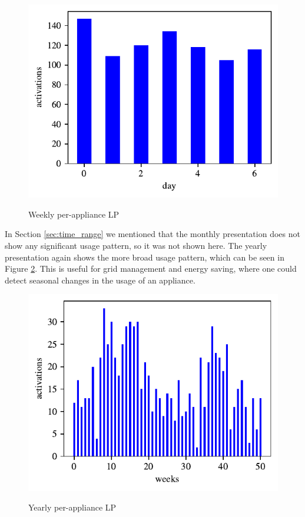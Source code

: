 \begin{figure}[H]
	\centering
	\caption{Weekly per-appliance LP}
	\includegraphics[]{../Figures/LPS/WM_weekly.pdf}
	\label{fig:WM_weekly}
\end{figure}

In Section \ref{sec:time_range} we mentioned that the monthly presentation does not show any significant usage pattern, so it was not shown here. 
The yearly presentation again shows the more broad usage pattern, which can be seen in Figure \ref{fig:WM_yearly}.
This is useful for grid management and energy saving, where one could detect seasonal changes in the usage of an appliance. 

\begin{figure}[H]
	\centering
	\caption{Yearly per-appliance LP}
	\includegraphics[]{../Figures/LPS/WM_yearly.pdf}
	\label{fig:WM_yearly}
\end{figure}


